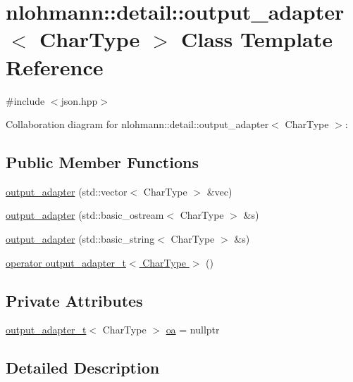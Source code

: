 \hypertarget{classnlohmann_1_1detail_1_1output__adapter}{}\section{nlohmann\+:\+:detail\+:\+:output\+\_\+adapter$<$ Char\+Type $>$ Class Template Reference}
\label{classnlohmann_1_1detail_1_1output__adapter}


{\ttfamily \#include $<$json.\+hpp$>$}



Collaboration diagram for nlohmann\+:\+:detail\+:\+:output\+\_\+adapter$<$ Char\+Type $>$\+:
\subsection*{Public Member Functions}
\begin{DoxyCompactItemize}
\item 
\hyperlink{classnlohmann_1_1detail_1_1output__adapter_a117bda35bc3de85fd2f5f2153d9705b4}{output\+\_\+adapter} (std\+::vector$<$ Char\+Type $>$ \&vec)
\item 
\hyperlink{classnlohmann_1_1detail_1_1output__adapter_ac086bc101f246eb815e46f17a9e68a4a}{output\+\_\+adapter} (std\+::basic\+\_\+ostream$<$ Char\+Type $>$ \&s)
\item 
\hyperlink{classnlohmann_1_1detail_1_1output__adapter_a07f996a817ffb420022cea56425f7d5c}{output\+\_\+adapter} (std\+::basic\+\_\+string$<$ Char\+Type $>$ \&s)
\item 
\hyperlink{classnlohmann_1_1detail_1_1output__adapter_adee7a0e124f483d9945b8b85c73d7957}{operator output\+\_\+adapter\+\_\+t$<$ Char\+Type $>$} ()
\end{DoxyCompactItemize}
\subsection*{Private Attributes}
\begin{DoxyCompactItemize}
\item 
\hyperlink{namespacenlohmann_1_1detail_a9b680ddfb58f27eb53a67229447fc556}{output\+\_\+adapter\+\_\+t}$<$ Char\+Type $>$ \hyperlink{classnlohmann_1_1detail_1_1output__adapter_a91f4b157cc22524555a5dce16aa56278}{oa} = nullptr
\end{DoxyCompactItemize}


\subsection{Detailed Description}
